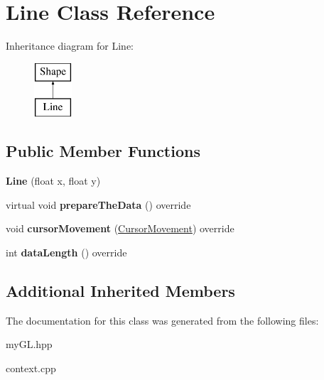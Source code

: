 \hypertarget{classLine}{}\section{Line Class Reference}
\label{classLine}
Inheritance diagram for Line\+:\begin{figure}[H]
\begin{center}
\leavevmode
\includegraphics[height=2.000000cm]{classLine}
\end{center}
\end{figure}
\subsection*{Public Member Functions}
\begin{DoxyCompactItemize}
\item 
{\bfseries Line} (float x, float y)\hypertarget{classLine_af86eb752cf0f65bd28b3c7f498862a26}{}\label{classLine_af86eb752cf0f65bd28b3c7f498862a26}

\item 
virtual void {\bfseries prepare\+The\+Data} () override\hypertarget{classLine_a344075dff1d956c5a1efe077c775c814}{}\label{classLine_a344075dff1d956c5a1efe077c775c814}

\item 
void {\bfseries cursor\+Movement} (\hyperlink{classCursorMovement}{Cursor\+Movement}) override\hypertarget{classLine_a5eda78277ddb35bc5b34035767e4a063}{}\label{classLine_a5eda78277ddb35bc5b34035767e4a063}

\item 
int {\bfseries data\+Length} () override\hypertarget{classLine_a9d6011bc5bfaa1398b6c84b878d4c391}{}\label{classLine_a9d6011bc5bfaa1398b6c84b878d4c391}

\end{DoxyCompactItemize}
\subsection*{Additional Inherited Members}


The documentation for this class was generated from the following files\+:\begin{DoxyCompactItemize}
\item 
my\+G\+L.\+hpp\item 
context.\+cpp\end{DoxyCompactItemize}
